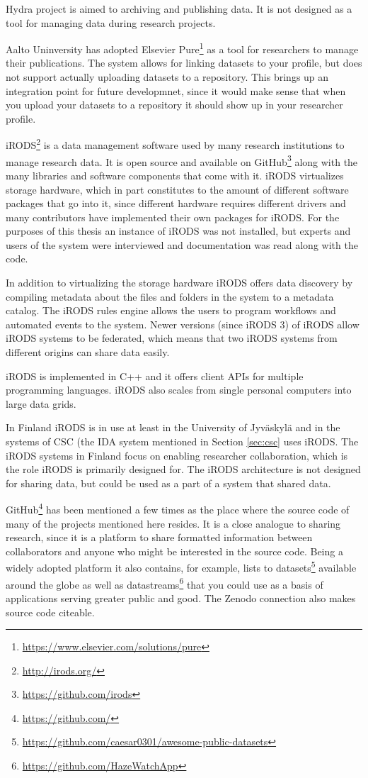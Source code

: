 Hydra project is aimed to archiving and publishing data. It is not designed as
a tool for managing data during research projects.

Aalto Uninversity has adopted Elsevier
Pure\footnote{\url{https://www.elsevier.com/solutions/pure}} as a tool for
researchers to manage their publications. The system allows for linking
datasets to your profile, but does not support actually uploading datasets
to a repository. This brings up an integration point for future developmnet,
since it would make sense that when you upload your datasets to a repository
it should show up in your researcher profile.

iRODS\footnote{\url{http://irods.org/}} is a data management software used by many research institutions to
manage research data. It is open source and available on GitHub\footnote{\url{https://github.com/irods}}
along with the many libraries and software components that come with it. iRODS
virtualizes storage hardware, which in part constitutes to the amount of
different software packages that go into it, since different hardware requires
different drivers and many contributors have implemented their own packages for
iRODS. For the purposes of this thesis an instance of iRODS was not installed,
but experts and users of the system were interviewed and documentation was read
along with the code.

In addition to virtualizing the storage hardware iRODS offers data discovery
by compiling metadata about the files and folders in the system to a metadata
catalog. The iRODS rules engine allows the users to program workflows and
automated events to the system. Newer versions (since iRODS 3) of iRODS allow
iRODS systems to be federated, which means that two iRODS systems from
different origins can share data easily.

iRODS is implemented in C++ and it offers client APIs for multiple programming
languages. iRODS also scales from single personal computers into large data
grids.

In Finland iRODS is in use at least in the University of Jyväskylä and in the
systems of CSC (the IDA system mentioned in Section \ref{sec:csc} uses iRODS.
The iRODS systems in Finland focus on enabling researcher collaboration, which
is the role iRODS is primarily designed for. The iRODS architecture is not
designed for sharing data, but could be used as a part of a system that shared
data.

GitHub\footnote{\url{https://github.com/}} has been mentioned a few times as
the place where the source code of many of the projects mentioned here resides.
It is a close analogue to sharing research, since it is a platform to share
formatted information between collaborators and anyone who might be interested
in the source code. Being a widely adopted platform it also contains, for
example, lists to datasets\footnote{\url{https://github.com/caesar0301/awesome-public-datasets}}
available around the globe as well as datastreams\footnote{\url{https://github.com/HazeWatchApp}}
that you could use as a basis of applications serving greater public and good.
The Zenodo connection also makes source code citeable.

